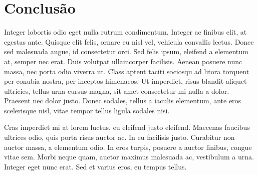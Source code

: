 \documentclass[12pt]{article}
\begin{document}
\section{Conclusão}\label{sec:conc}
Integer lobortis odio eget nulla rutrum condimentum. Integer ac finibus elit, at egestas ante. Quisque elit felis, ornare eu nisl vel, vehicula convallis lectus. Donec sed malesuada augue, id consectetur orci. Sed felis ipsum, eleifend a elementum at, semper nec erat. Duis volutpat ullamcorper facilisis. Aenean posuere nunc massa, nec porta odio viverra ut. Class aptent taciti sociosqu ad litora torquent per conubia nostra, per inceptos himenaeos. Ut imperdiet, risus blandit aliquet ultricies, tellus urna cursus magna, sit amet consectetur mi nulla a dolor. Praesent nec dolor justo. Donec sodales, tellus a iaculis elementum, ante eros scelerisque nisl, vitae tempor tellus ligula sodales nisi.

Cras imperdiet mi at lorem luctus, eu eleifend justo eleifend. Maecenas faucibus ultrices odio, quis porta risus auctor ac. In eu facilisis justo. Curabitur non auctor massa, a elementum odio. In eros turpis, posuere a auctor finibus, congue vitae sem. Morbi neque quam, auctor maximus malesuada ac, vestibulum a urna. Integer eget nunc erat. Sed et varius eros, eu tempus tellus.



\end{document}
